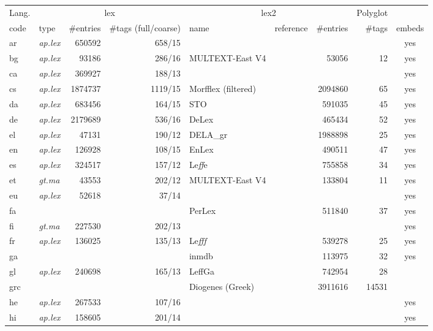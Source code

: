 \documentclass[11pt,letterpaper]{article}
\begin{document}
\begin{table}
\centering
\scriptsize
\begin{tabular}{l|lrr|llrrc}
\toprule
Lang. & \multicolumn{3}{c}{\sc lex} & \multicolumn{3}{|c}{\sc lex2} & Polyglot\\
code & type & \#entries & \#tags (full/coarse) & name & reference & \#entries & \#tags & embeds\\
\midrule
ar & {\em ap.lex} & 650592 & 658/15 &  &  &  &  & yes\\
bg & {\em ap.lex} & 93186 & 286/16 & MULTEXT-East V4 & \citep{erjavec10} & 53056 & 12 & yes\\
ca & {\em ap.lex} & 369927 & 188/13 &  &  &  &  & yes\\
cs & {\em ap.lex} & 1874737 & 1119/15 & Morfflex (filtered) & \citep{hajic13} & 2094860 & 65 & yes\\
da & {\em ap.lex} & 683456 & 164/15 & STO & \citep{braasch08} & 591035 & 45 & yes\\
de & {\em ap.lex} & 2179689 & 536/16 & DeLex & \citep{sagot14delex} & 465434 & 52 & yes\\
el & {\em ap.lex} & 47131 & 190/12 & DELA\_gr & \citep{symeonidis99} & 1988898 & 25 & yes\\
en & {\em ap.lex} & 126928 & 108/15 & EnLex & \citep{sagot10lefff} & 490511 & 47 & yes\\
es & {\em ap.lex} & 324517 & 157/12 & Le{\it ff}e & \citep{molinero09} & 755858 & 34 & yes\\
et & {\em gt.ma} & 43553 & 202/12 & MULTEXT-East V4 & \citep{erjavec10} & 133804 & 11 & yes\\
eu & {\em ap.lex} & 52618 & 37/14 &  &  &  &  & yes\\
fa &  &  &  & PerLex & \citep{sagot10perlex} & 511840 & 37 & yes\\
fi & {\em gt.ma} & 227530 & 202/13 &  &  &  &  & yes\\
fr & {\em ap.lex} & 136025 & 135/13 & Le{\it fff} & \citep{sagot10lefff} & 539278 & 25 & yes\\
ga &  &  &  & inmdb & \citep{mechura14} & 113975 & 32 & yes\\
gl & {\em ap.lex} & 240698 & 165/13 & LeffGa & \citep{sagot10lefff} & 742954 & 28 & \\
grc &  &  &  & Diogenes (Greek) & \citep{heslin07} & 3911616 & 14531 & \\
he & {\em ap.lex} & 267533 & 107/16 &  &  &  &  & yes\\
hi & {\em ap.lex} & 158605 & 201/14 &  &  &  &  & yes\\

\end{tabular}
\end{table}
\end{document}

